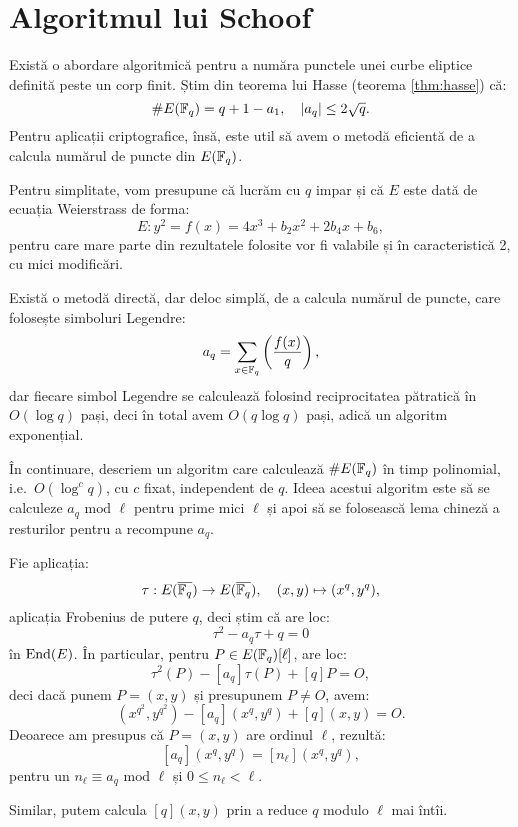 
\chapter{Algoritmul lui Schoof}


Există o abordare algoritmică pentru a număra punctele unei curbe
eliptice definită peste un corp finit. Știm din teorema lui Hasse
(teorema \ref{thm:hasse}) că:
\[
    \# E(\mathbb{F}_q) = q + 1 - a_1, \quad |a_q| \leq 2 \sqrt{q}.
\]
Pentru aplicații criptografice, însă, este util să avem o metodă
eficientă de a calcula numărul de puncte din $ E(\mathbb{F}_q) $.

Pentru simplitate, vom presupune că lucrăm cu $ q $ impar și
că $ E $ este dată de ecuația Weierstrass de forma:
\[
    E: y^2 = f(x) = 4x^3 + b_2x^2 + 2b_4x + b_6,
\]
pentru care mare parte din rezultatele folosite vor fi valabile
și în caracteristică 2, cu mici modificări.

Există o metodă directă, dar deloc simplă, de a calcula numărul de
puncte, care folosește simboluri Legendre:
\[
    a_q = \sum_{x \in \mathbb{F}_q} \left( \dfrac{f(x)}{q} \right),
\]
dar fiecare simbol Legendre se calculează folosind reciprocitatea
pătratică în $ O(\log q) $ pași, deci în total avem $ O(q \log q) $
pași, adică un algoritm exponențial.

În continuare, descriem un algoritm care calculează $ \# E(\mathbb{F}_q) $ în
timp polinomial, i.e.\ $ O(\log^c q) $, cu $ c $ fixat, independent de $ q $.
Ideea acestui algoritm este să se calculeze $ a_q \text{ mod } \ell $
pentru prime mici $ \ell $ și apoi să se folosească lema chineză a resturilor
pentru a recompune $ a_q $.

Fie aplicația:
\[
    \tau : E(\overline{\mathbb{F}_q}) \to E(\overline{\mathbb{F}_q}), \quad (x, y) \mapsto (x^q, y^q),
\]
aplicația Frobenius de putere $ q $, deci știm că are loc:
\[
    \tau^2 - a_q \tau + q = 0
\]
în $ \mathrm{End}(E) $. În particular, pentru $ P \in E(\mathbb{F}_q)[\ell] $, are loc:
\[
    \tau^2(P) - [a_q]\tau(P) + [q]P = O,
\]
deci dacă punem $ P = (x, y) $ și presupunem $ P \neq O $, avem:
\[
    (x^{q^2}, y^{q^2}) - [a_q](x^q, y^q) + [q](x, y) = O.
\]
Deoarece am presupus că $ P = (x, y) $ are ordinul $ \ell $, rezultă:
\[
    [a_q](x^q, y^q) = [n_\ell](x^q, y^q),
\]
pentru un $ n_\ell \equiv a_q \text{ mod } \ell $ și $ 0 \leq n_\ell < \ell $.

Similar, putem calcula $ [q](x, y) $ prin a reduce $ q $ modulo $ \ell $ mai
întîi.

